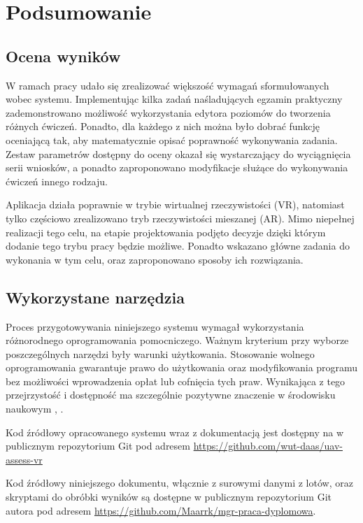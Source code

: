 \newpage
\section{Podsumowanie}

\subsection{Ocena wyników}
W ramach pracy udało się zrealizować większość wymagań sformułowanych wobec systemu. Implementując kilka zadań naśladujących egzamin praktyczny zademonstrowano możliwość wykorzystania edytora poziomów do tworzenia różnych ćwiczeń. Ponadto, dla każdego z nich można było dobrać funkcję oceniającą tak, aby matematycznie opisać poprawność wykonywania zadania. Zestaw parametrów dostępny do oceny okazał się wystarczający do wyciągnięcia serii wniosków, a ponadto zaproponowano modyfikacje służące do wykonywania ćwiczeń innego rodzaju.

Aplikacja działa poprawnie w trybie wirtualnej rzeczywistości (VR), natomiast tylko częściowo zrealizowano tryb rzeczywistości mieszanej (AR). Mimo niepełnej realizacji tego celu, na etapie projektowania podjęto decyzje dzięki którym dodanie tego trybu pracy będzie możliwe. Ponadto wskazano główne zadania do wykonania w tym celu, oraz zaproponowano sposoby ich rozwiązania.

\subsection{Wykorzystane narzędzia}
Proces przygotowywania niniejszego systemu wymagał wykorzystania różnorodnego oprogramowania pomocniczego. Ważnym kryterium przy wyborze poszczególnych narzędzi były warunki użytkowania. Stosowanie wolnego oprogramowania gwarantuje prawo do użytkowania oraz modyfikowania programu bez możliwości wprowadzenia opłat lub cofnięcia tych praw. Wynikająca z tego przejrzystość i dostępność ma szczególnie pozytywne znaczenie w środowisku naukowym \cite{courant2006}, \cite{lakhan2008}.

Kod źródłowy opracowanego systemu wraz z dokumentacją jest dostępny na w publicznym repozytorium Git pod adresem \url{https://github.com/wut-daas/uav-assess-vr}

Kod źródłowy niniejszego dokumentu, włącznie z surowymi danymi z lotów, oraz skryptami do obróbki wyników są dostępne w publicznym repozytorium Git autora pod adresem \url{https://github.com/Maarrk/mgr-praca-dyplomowa}.

